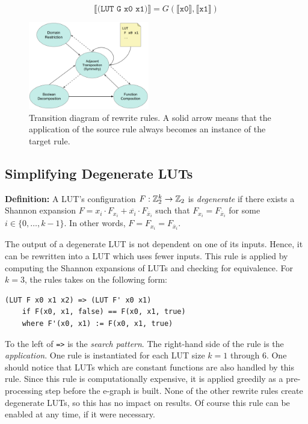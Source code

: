 \begin{equation}
    \llbracket \texttt{(LUT G x0 x1)} \rrbracket = G(\llbracket \texttt{x0} \rrbracket, \llbracket \texttt{x1} \rrbracket)
\end{equation}

\begin{figure}
    \centering
    \includegraphics[width=0.47\textwidth]{img/rewrites.png}
    \caption{Transition diagram of rewrite rules. A solid arrow means that the application of the source rule always becomes an instance of the target rule.}\label{fig:rewrites}
\end{figure}

\subsection{Simplifying Degenerate LUTs}\label{sec:rewrites:degen}

\textbf{Definition:} A LUT's configuration $F : \mathbb{Z}_{2}^{k} \rightarrow \mathbb{Z}_{2}$ is \textit{degenerate} if there exists a Shannon expansion $F = x_i \cdot F_{x_i} + \overline{x_i} \cdot F_{\overline{x}_i}$
such that $F_{x_i} = F_{\overline{x}_i}$ for some $i \in \{ 0, \ldots, k -1\}$. In other words, $F = F_{x_i} = F_{\overline{x}_i}$.

The output of a degenerate LUT is not dependent on one of its inputs. Hence, it
can be rewritten into a LUT which uses fewer inputs. This rule is applied by
computing the Shannon expansions of LUTs and checking for equivalence. For
$k=3$, the rules takes on the following form:

\begin{lstlisting}
(LUT F x0 x1 x2) => (LUT F' x0 x1)
    if F(x0, x1, false) == F(x0, x1, true)
    where F'(x0, x1) := F(x0, x1, true)
\end{lstlisting}

To the left of \texttt{=>} is the \textit{search pattern}. The right-hand side
of the rule is the \textit{application}. One rule is instantiated for each LUT
size $k =1$ through 6. One should notice that LUTs which are constant functions
are also handled by this rule. Since this rule is computationally expensive, it
is applied greedily as a pre-processing step before the e-graph is built. None
of the other rewrite rules create degenerate LUTs, so this has no impact on
results. Of course this rule can be enabled at any time, if it were necessary.

